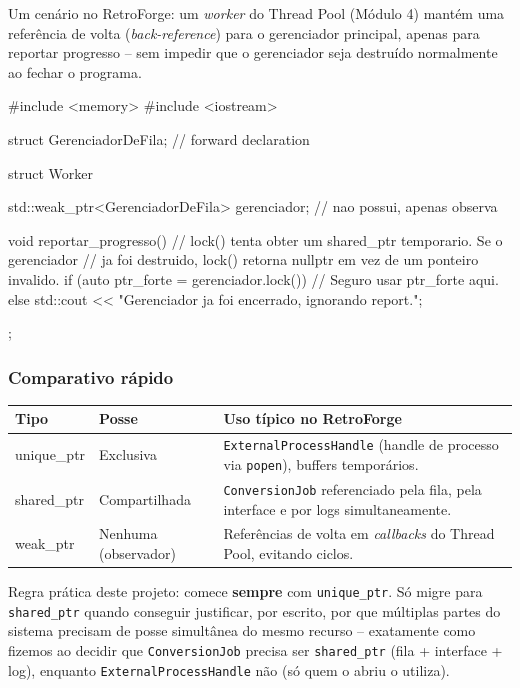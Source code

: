 Um cenário no RetroForge: um \textit{worker} do Thread Pool (Módulo 4) mantém uma referência de volta (\textit{back-reference}) para o gerenciador principal, apenas para reportar progresso -- sem impedir que o gerenciador seja destruído normalmente ao fechar o programa.

\begin{CaixaCodigo}
#include <memory>
#include <iostream>

struct GerenciadorDeFila; // forward declaration

struct Worker {
    std::weak_ptr<GerenciadorDeFila> gerenciador; // nao possui, apenas observa

    void reportar_progresso() {
        // lock() tenta obter um shared_ptr temporario. Se o gerenciador
        // ja foi destruido, lock() retorna nullptr em vez de um ponteiro invalido.
        if (auto ptr_forte = gerenciador.lock()) {
            // Seguro usar ptr_forte aqui.
        } else {
            std::cout << "Gerenciador ja foi encerrado, ignorando report.\n";
        }
    }
};
\end{CaixaCodigo}

\subsubsection{Comparativo rápido}

\begin{center}
\begin{tabular}{|>{\ttfamily}l|l|p{6.7cm}|}
\hline
\textbf{Tipo} & \textbf{Posse} & \textbf{Uso típico no RetroForge} \\
\hline
unique\_ptr & Exclusiva & \texttt{ExternalProcessHandle} (handle de processo via \texttt{popen}), buffers temporários. \\
\hline
shared\_ptr & Compartilhada & \texttt{ConversionJob} referenciado pela fila, pela interface e por logs simultaneamente. \\
\hline
weak\_ptr & Nenhuma (observador) & Referências de volta em \textit{callbacks} do Thread Pool, evitando ciclos. \\
\hline
\end{tabular}
\end{center}

\begin{CaixaAlerta}
Regra prática deste projeto: comece \textbf{sempre} com \texttt{unique\_ptr}. Só migre para \texttt{shared\_ptr} quando conseguir justificar, por escrito, por que múltiplas partes do sistema precisam de posse simultânea do mesmo recurso -- exatamente como fizemos ao decidir que \texttt{ConversionJob} precisa ser \texttt{shared\_ptr} (fila + interface + log), enquanto \texttt{ExternalProcessHandle} não (só quem o abriu o utiliza).
\end{CaixaAlerta}

